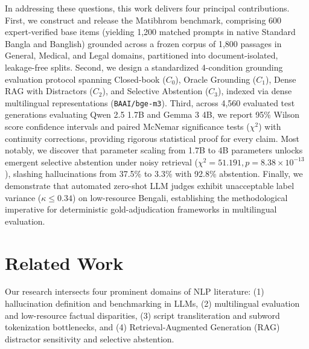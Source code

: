 \documentclass[11pt,a4paper,twocolumn]{article}
\begin{document}
In addressing these questions, this work delivers four principal contributions. First, we construct and release the Matibhrom benchmark, comprising 600 expert-verified base items (yielding 1,200 matched prompts in native Standard Bangla and Banglish) grounded across a frozen corpus of 1,800 passages in General, Medical, and Legal domains, partitioned into document-isolated, leakage-free splits. Second, we design a standardized 4-condition grounding evaluation protocol spanning Closed-book ($C_0$), Oracle Grounding ($C_1$), Dense RAG with Distractors ($C_2$), and Selective Abstention ($C_3$), indexed via dense multilingual representations (\texttt{BAAI/bge-m3}). Third, across 4,560 evaluated test generations evaluating Qwen 2.5 1.7B and Gemma 3 4B, we report 95\% Wilson score confidence intervals and paired McNemar significance tests ($\chi^2$) with continuity corrections, providing rigorous statistical proof for every claim. Most notably, we discover that parameter scaling from 1.7B to 4B parameters unlocks emergent selective abstention under noisy retrieval ($\chi^2 = 51.191, p = 8.38 \times 10^{-13}$), slashing hallucinations from 37.5\% to 3.3\% with 92.8\% abstention. Finally, we demonstrate that automated zero-shot LLM judges exhibit unacceptable label variance ($\kappa \le 0.34$) on low-resource Bengali, establishing the methodological imperative for deterministic gold-adjudication frameworks in multilingual evaluation.

\section{Related Work}
\label{sec:related_work}

Our research intersects four prominent domains of NLP literature: (1) hallucination definition and benchmarking in LLMs, (2) multilingual evaluation and low-resource factual disparities, (3) script transliteration and subword tokenization bottlenecks, and (4) Retrieval-Augmented Generation (RAG) distractor sensitivity and selective abstention.
\end{document}
